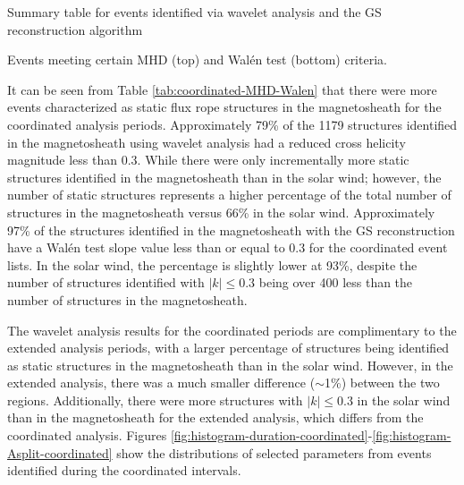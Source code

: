\begin{table}
    \centering
    \caption{Summary table for events identified via wavelet analysis and the GS reconstruction algorithm}
    
    \label{tab:coordinated-summary}
\end{table}

\begin{table}
    \centering
    \caption{Events meeting certain MHD (top) and Wal\'en test (bottom) criteria.}
    
    \label{tab:coordinated-MHD-Walen}
\end{table}

\noindent It can be seen from Table \ref{tab:coordinated-MHD-Walen} that there were more events characterized as static flux rope structures in the magnetosheath for the coordinated analysis periods. Approximately 79\% of the 1179 structures identified in the magnetosheath using wavelet analysis had a reduced cross helicity magnitude less than 0.3. While there were only incrementally more static structures identified in the magnetosheath than in the solar wind; however, the number of static structures represents a higher percentage of the total number of structures in the magnetosheath versus 66\% in the solar wind. Approximately 97\% of the structures identified in the magnetosheath with the GS reconstruction have a Wal\'en test slope value less than or equal to 0.3 for the coordinated event lists. In the solar wind, the percentage is slightly lower at 93\%, despite the number of structures identified with $|k|\leq 0.3$ being over 400 less than the number of structures in the magnetosheath.

The wavelet analysis results for the coordinated periods are complimentary to the extended analysis periods, with a larger percentage of structures being identified as static structures in the magnetosheath than in the solar wind. However, in the extended analysis, there was a much smaller difference ($\sim$1\%) between the two regions. Additionally, there were more structures with $|k|\leq 0.3$ in the solar wind than in the magnetosheath for the extended analysis, which differs from the coordinated analysis. Figures \ref{fig:histogram-duration-coordinated}-\ref{fig:histogram-Asplit-coordinated} show the distributions of selected parameters from events identified during the coordinated intervals.

